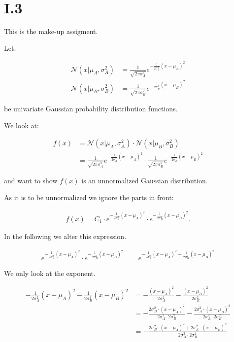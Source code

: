\FloatBarrier
\pagebreak
\section*{I.3}

This is the make-up assigment.

Let:

\begin{align*}
\mathcal{N} (x|\mu_A,\sigma_A^2) &= \frac{1}{\sqrt{2\pi\sigma_A^2}} e^{-\frac{1}{2\sigma_A^2}(x-\mu_A)^2} \\
\mathcal{N} (x|\mu_B,\sigma_B^2) &= \frac{1}{\sqrt{2\pi\sigma_B^2}} e^{-\frac{1}{2\sigma_B^2}(x-\mu_B)^2}
\end{align*}

be univariate Gaussian probability distribution functions.

We look at:

\begin{align*}
f(x) &= \mathcal{N} (x|\mu_A,\sigma_A^2) \cdot \mathcal{N} (x|\mu_B,\sigma_B^2) \\
     &= \frac{1}{\sqrt{2\pi\sigma_A^2}} e^{-\frac{1}{2\sigma_A^2}(x-\mu_A)^2} \cdot
\frac{1}{\sqrt{2\pi\sigma_B^2}} e^{-\frac{1}{2\sigma_B^2}(x-\mu_B)^2}
\end{align*}

and want to show $f(x)$ is an unnormalized Gaussian distribution.

As it is to be unnormalized we ignore the parts in front:

\begin{align*}
f(x) = C_1 \cdot e^{-\frac{1}{2\sigma_A^2}(x-\mu_A)^2} \cdot e^{-\frac{1}{2\sigma_B^2}(x-\mu_B)^2}.
\end{align*}

In the following we alter this expression.

\begin{align*}
e^{-\frac{1}{2\sigma_A^2}(x-\mu_A)^2} \cdot e^{-\frac{1}{2\sigma_B^2}(x-\mu_B)^2}
&= e^{-\frac{1}{2\sigma_A^2}(x-\mu_A)^2-\frac{1}{2\sigma_B^2}(x-\mu_B)^2}
\end{align*}

We only look at the exponent.

\begin{align*}
-\frac{1}{2\sigma_A^2}(x-\mu_A)^2-\frac{1}{2\sigma_B^2}(x-\mu_B)^2 &=
-\frac{(x-\mu_A)^2}{2\sigma_A^2}-\frac{(x-\mu_B)^2}{2\sigma_B^2} \\
&= -\frac{2\sigma_B^2 \cdot (x-\mu_A)^2}{2\sigma_A^2 \cdot 2\sigma_B^2}
   -\frac{2\sigma_A^2 \cdot (x-\mu_B)^2}{2\sigma_A^2 \cdot 2\sigma_B^2}\\
&= -\frac{2\sigma_B^2 \cdot (x-\mu_A)^2+2\sigma_A^2 \cdot (x-\mu_B)^2}{2\sigma_A^2 \cdot 2\sigma_B^2}
\end{align*}

